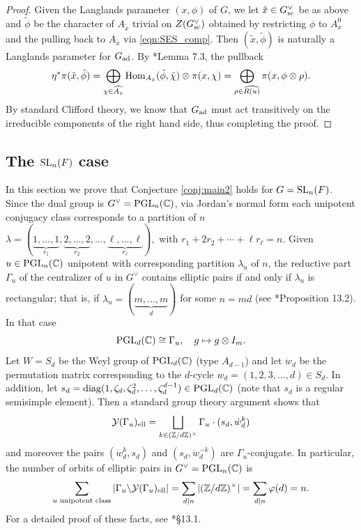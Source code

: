 \begin{proof}
    Given the Langlands parameter $(x,\phi)$ of $G$, we let $\tilde{x}\in G^\vee_{\mathrm{sc}}$ be as above and $\tilde{\phi}$ be the character of $A_{\tilde{x}}$ trivial on $Z(G^\vee_{\mathrm{sc}})$ obtained by restricting $\phi$ to $A_x^0$ and the pulling back to $A_{\tilde{x}}$ via \eqref{eqn:SES_comp}. Then $(\tilde{x},\tilde{\phi})$ is naturally a Langlands parameter for $G_{\mathrm{ad}}$. By \cite{Solleveld2020}*{Lemma 7.3}, the pullback 
    $$\eta^*\pi(\tilde{x},\tilde{\phi})=\bigoplus_{\chi\in\widehat{A_x}}\mathrm{Hom}_{A_{\tilde{x}}}(\tilde{\phi},\tilde{\chi})\otimes\pi(x,\chi)=\bigoplus_{\rho\in\widehat{R(u)}}\pi(x,\phi\otimes\rho).$$
    By standard Clifford theory, we know that $G_{\mathrm{ad}}$ must act transitively on the irreducible components of the right hand side, thus completing the proof.
\end{proof}

\newpage
\fi

\subsection{The \texorpdfstring{$\mathrm{SL}_n(F)$}{PDFstring} case} \label{subsec:SLn}

In this section we prove that Conjecture \ref{conj:main2} holds for $G=\mathrm{SL}_n(F)$. Since the dual group is $G^\vee=\mathrm{PGL}_n(\mathbb{C})$, via Jordan's normal form each unipotent conjugacy class corresponds to a partition of $n$ $\lambda= (\underbrace{1,\ldots,1}_{r_1}, \underbrace{2,\ldots,2}_{r_2}, \ldots, \underbrace{\ell,\ldots,\ell}_{r_\ell}),$ with $r_1+2r_2+\cdots+\ell r_\ell=n$. Given $u\in\mathrm{PGL}_n(\mathbb{C})$ unipotent with corresponding partition $\lambda_u$ of $n$, the reductive part $\Gamma_u$ of the centralizer of $u$ in $G^\vee$ contains elliptic pairs if and only if $\lambda_u$ is rectangular; that is, if $\lambda_u=(\underbrace{m,\ldots,m}_{d})$ for some $n=md$ (see \cite{AubertCiubotaruRomano2024}*{Proposition 13.2}). In that case 
\[
    \mathrm{PGL}_d(\mathbb{C})\cong\Gamma_u,\quad g\mapsto g\otimes I_m.
\] 
Let $W=S_d$ be the Weyl group of $\mathrm{PGL}_d(\mathbb{C})$ (type $A_{d-1}$) and let $\dot{w}_d$ be the permutation matrix corresponding to the $d$-cycle $w_d=(1,2,3,\ldots,d)\in S_d$. In addition, let $s_d=\mathrm{diag}(1,\zeta_d,\zeta_d^2,\ldots,\zeta_d^{d-1})\in\mathrm{PGL}_d(\mathbb{C})$ (note that $s_d$ is a  regular semisimple element). Then a standard group theory argument shows that 
\[
    \mathcal{Y}(\Gamma_u)_{\mathrm{ell}}=\bigsqcup_{k\in(\mathbb{Z}/d\mathbb{Z})^\times} \Gamma_u\cdot(s_d,\dot{w}_d^k)
\]
and moreover the pairs $(\dot{w}_d^k,s_d)$ and $(s_d,\dot{w}_d^{-k})$ are $\Gamma_u$-conjugate. In particular, the number of orbits of elliptic pairs in $G^\vee=\mathrm{PGL}_n(\mathbb{C})$ is 
\begin{equation*}
    \sum_{u\text{ unipotent class}}|\Gamma_u\backslash\mathcal{Y}(\Gamma_u)_{\mathrm{ell}}|=\sum_{d\mid n}|(\mathbb{Z}/d\mathbb{Z})^\times|=\sum_{d\mid n}\varphi(d)=n.
\end{equation*}
For a detailed proof of these facts, see \cite{AubertCiubotaruRomano2024}*{\S 13.1}. 

